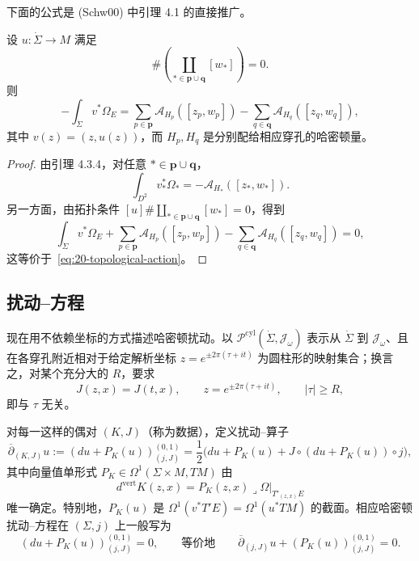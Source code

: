下面的公式是 (Schw00) 中引理 4.1 的直接推广。

\begin{lemma}
\label{lem:20-topological-action-identity}
设 $u:\dot\Sigma\to M$ 满足
\begin{equation}
 [u]\#\left(\coprod_{*\in\mathbf p\cup\mathbf q}[w_*]\right)=0.
 \label{eq:20-zero-capping-class}
\end{equation}
则
\begin{equation}
 -\int_{\dot\Sigma}v^*\Omega_E
 =\sum_{p\in\mathbf p}\mathcal A_{H_p}([z_p,w_p])
 -\sum_{q\in\mathbf q}\mathcal A_{H_q}([z_q,w_q]),
 \label{eq:20-topological-action}
\end{equation}
其中 $v(z)=(z,u(z))$，而 $H_p,H_q$ 是分别配给相应穿孔的哈密顿量。
\end{lemma}

\begin{proof}
由引理 4.3.4，对任意 $*\in\mathbf p\cup\mathbf q$，
\begin{equation}
 \int_{D^2}v_*^*\Omega_*=-\mathcal A_{H_*}([z_*,w_*]).
 \label{eq:20-cap-action}
\end{equation}
另一方面，由拓扑条件
$[u]\#\coprod_{*\in\mathbf p\cup\mathbf q}[w_*]=0$，得到
\begin{equation}
 \int_{\dot\Sigma}v^*\Omega_E
 +\sum_{p\in\mathbf p}\mathcal A_{H_p}([z_p,w_p])
 -\sum_{q\in\mathbf q}\mathcal A_{H_q}([z_q,w_q])=0,
 \label{eq:20-action-sum-zero}
\end{equation}
这等价于~\eqref{eq:20-topological-action}。
\end{proof}

\subsection{扰动\personCauchy{}--\personRiemann{}方程}

现在用不依赖坐标的方式描述哈密顿扰动。以
$\mathcal P^{\mathrm{cyl}}(\dot\Sigma,\mathcal J_\omega)$ 表示从 $\dot\Sigma$ 到
$\mathcal J_\omega$、且在各穿孔附近相对于给定解析坐标
$z=e^{\pm2\pi(\tau+it)}$ 为圆柱形的映射集合；换言之，对某个充分大的 $R$，要求
\begin{equation}
 J(z,x)=J(t,x),\qquad z=e^{\pm2\pi(\tau+it)},\qquad |\tau|\geq R,
 \label{eq:20-cylindrical-j}
\end{equation}
即与 $\tau$ 无关。

对每一这样的偶对 $(K,J)$（称为\personFloer{}数据），定义扰动\personCauchy{}--\personRiemann{}算子
\[
 \overline\partial_{(K,J)}u:=(du+P_K(u))_{(j,J)}^{(0,1)}
 =\frac12\bigl(du+P_K(u)+J\circ(du+P_K(u))\circ j\bigr),
\]
其中向量值单形式 $P_K\in\Omega^1(\Sigma\times M,TM)$ 由
\[
 d^{\mathrm{vert}}K(z,x)=P_K(z,x)\mathbin{\lrcorner}
 \Omega|_{T'_{(z,x)}E}
\]
唯一确定。特别地，$P_K(u)$ 是
$\Omega^1(v^*T'E)=\Omega^1(u^*TM)$ 的截面。相应哈密顿扰动\personCauchy{}--\personRiemann{}方程在 $(\Sigma,j)$ 上一般写为
\begin{equation}
 (du+P_K(u))_{(j,J)}^{(0,1)}=0,
 \qquad\text{等价地}\qquad
 \overline\partial_{(j,J)}u+(P_K(u))_{(j,J)}^{(0,1)}=0.
 \label{eq:20-perturbed-cr-equation}
\end{equation}

